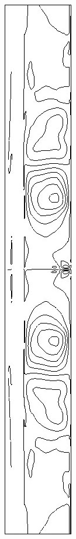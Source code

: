\begin{figure}[h]
\begin{subfigure}[b]{0.15\textwidth}
\caption{ }
\end{subfigure}
\begin{subfigure}[b]{0.15\textwidth}
\centering
\includegraphics[width=\textwidth]{png/cranium/2d-sxy-02.png}

\end{subfigure}
\end{figure}
